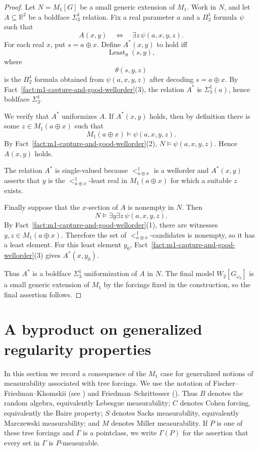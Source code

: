 \documentclass[a4paper,11pt]{article}
\begin{document}
\begin{proof}
Let $N=M_1[G]$ be a small generic extension of $M_1$.  Work in $N$, and let $A\subseteq\mathbb R^2$ be a boldface $\Sigma^1_3$ relation.  Fix a real parameter $a$ and a $\Pi^1_2$ formula $\psi$ such that
\[
   A(x,y)\quad\Longleftrightarrow\quad \exists z\,\psi(a,x,y,z).
\]
For each real $x$, put $s=a\oplus x$.  Define $A^*(x,y)$ to hold iff
\[
   \operatorname{Least}_{\theta}(s,y),
\]
where
\[
   \theta(s,y,z)
\]
is the $\Pi^1_2$ formula obtained from $\psi(a,x,y,z)$ after decoding $s=a\oplus x$.
By Fact~\ref{fact:m1-capture-and-good-wellorder}(3), the relation $A^*$ is $\Sigma^1_3(a)$, hence boldface $\Sigma^1_3$.

We verify that $A^*$ uniformizes $A$.  If $A^*(x,y)$ holds, then by definition there is some $z\in M_1(a\oplus x)$ such that
\[
   M_1(a\oplus x)\models \psi(a,x,y,z).
\]
By Fact~\ref{fact:m1-capture-and-good-wellorder}(2), $N\models\psi(a,x,y,z)$.  Hence $A(x,y)$ holds.

The relation $A^*$ is single-valued because $<^1_{a\oplus x}$ is a wellorder and $A^*(x,y)$ asserts that $y$ is the $<^1_{a\oplus x}$-least real in $M_1(a\oplus x)$ for which a suitable $z$ exists.

Finally suppose that the $x$-section of $A$ is nonempty in $N$.  Then
\[
   N\models \exists y\exists z\,\psi(a,x,y,z).
\]
By Fact~\ref{fact:m1-capture-and-good-wellorder}(1), there are witnesses $y,z\in M_1(a\oplus x)$.  Therefore the set of $<^1_{a\oplus x}$-candidates is nonempty, so it has a least element.  For this least element $y_0$, Fact~\ref{fact:m1-capture-and-good-wellorder}(3) gives $A^*(x,y_0)$.

Thus $A^*$ is a boldface $\Sigma^1_3$ uniformization of $A$ in $N$.  The final model $W_2[G_{\omega_2}]$ is a small generic extension of $M_1$ by the forcings fixed in the construction, so the final assertion follows.
\end{proof}


\section{A byproduct on generalized regularity properties}

In this section we record a consequence of the $M_1$ case for generalized
notions of measurability associated with tree forcings. We use the notation of
Fischer--Friedman--Khomskii (see \cite{FischerFriedmanKhomskii}) and Friedman--Schrittesser (\cite{FriedmanSchrittesser}). Thus $B$ denotes the
random algebra, equivalently Lebesgue measurability; $C$ denotes Cohen forcing,
equivalently the Baire property; $S$ denotes Sacks measurability, equivalently
Marczewski measurability; and $M$ denotes Miller measurability. If $P$ is one
of these tree forcings and $\Gamma$ is a pointclass, we write $\Gamma(P)$ for
the assertion that every set in $\Gamma$ is $P$-measurable.
\end{document}
